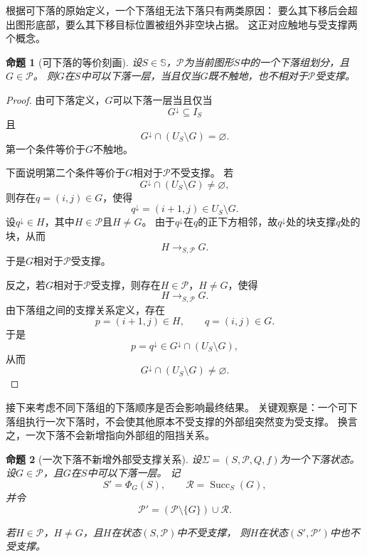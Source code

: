 \documentclass[UTF8,fontset=none]{ctexart}
\theoremstyle{cnthm}
\newtheorem{proposition}{命题}[section]
\begin{document}
			根据可下落的原始定义，一个下落组无法下落只有两类原因：
			要么其下移后会超出图形底部，要么其下移目标位置被组外非空块占据。
			这正对应触地与受支撑两个概念。
			
			\begin{proposition}[可下落的等价刻画]\label{prop:fallable-characterization}
				设$S\in\mathbb{S}$，$\mathcal{P}$为当前图形$S$中的一个下落组划分，且$G\in\mathcal{P}$。
				则$G$在$S$中可以下落一层，当且仅当$G$既不触地，也不相对于$\mathcal{P}$受支撑。
			\end{proposition}
			
			\begin{proof}
				由可下落定义，$G$可以下落一层当且仅当
				$$
				G^\downarrow\subseteq I_S
				$$
				且
				$$
				G^\downarrow\cap(U_S\setminus G)=\varnothing.
				$$
				第一个条件等价于$G$不触地。
				
				下面说明第二个条件等价于$G$相对于$\mathcal{P}$不受支撑。
				若
				$$
				G^\downarrow\cap(U_S\setminus G)\neq\varnothing,
				$$
				则存在$q=(i,j)\in G$，使得
				$$
				q^\downarrow=(i+1,j)\in U_S\setminus G.
				$$
				设$q^\downarrow\in H$，其中$H\in\mathcal{P}$且$H\neq G$。
				由于$q^\downarrow$在$q$的正下方相邻，故$q^\downarrow$处的块支撑$q$处的块，从而
				$$
				H\to_{S,\mathcal{P}}G.
				$$
				于是$G$相对于$\mathcal{P}$受支撑。
				
				反之，若$G$相对于$\mathcal{P}$受支撑，则存在$H\in\mathcal{P}$，$H\neq G$，使得
				$$
				H\to_{S,\mathcal{P}}G.
				$$
				由下落组之间的支撑关系定义，存在
				$$
				p=(i+1,j)\in H,\qquad q=(i,j)\in G.
				$$
				于是
				$$
				p=q^\downarrow\in G^\downarrow\cap(U_S\setminus G),
				$$
				从而
				$$
				G^\downarrow\cap(U_S\setminus G)\neq\varnothing.
				$$
			\end{proof}
			
			接下来考虑不同下落组的下落顺序是否会影响最终结果。
			关键观察是：一个可下落组执行一次下落时，不会使其他原本不受支撑的外部组突然变为受支撑。
			换言之，一次下落不会新增指向外部组的阻挡关系。
			
			\begin{proposition}[一次下落不新增外部受支撑关系]\label{prop:no-new-external-support}
				设$\Sigma=(S,\mathcal{P},Q,f)$为一个下落状态。
				设$G\in\mathcal{P}$，且$G$在$S$中可以下落一层。
				记
				$$
				S'=\Phi_G(S),
				\qquad
				\mathcal{R}=\operatorname{Succ}_S(G),
				$$
				并令
				$$
				\mathcal{P}'
				=
				(\mathcal{P}\setminus\{G\})\cup\mathcal{R}.
				$$
				
				若$H\in\mathcal{P}$，$H\neq G$，且$H$在状态$(S,\mathcal{P})$中不受支撑，
				则$H$在状态$(S',\mathcal{P}')$中也不受支撑。
			\end{proposition}
			
\end{document}

